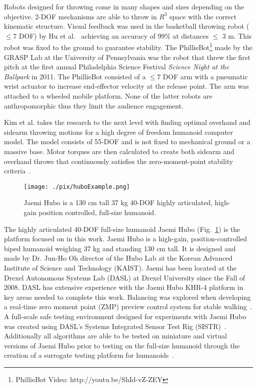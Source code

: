 Robots designed for throwing come in many shapes and sizes depending on the objective.  
2-DOF mechanisms are able to throw in $R^3$ space with the correct kinematic structure.  
Visual feedback was used in the basketball throwing robot ($\leq 7$ DOF) by Hu et al.~\cite{5649335} achieving an accuracy of 99\% at distances $\leq$ 3 m.  
This robot was fixed to the ground to guarantee stability.
The PhillieBot\footnote{PhillieBot Video: http://youtu.be/ShId-vZ-ZEY} made by the GRASP Lab at the University of Pennsylvania was the robot that threw the first pitch at the first annual Philadelphia Science Festival \textit{Science Night at the Ballpark} in 2011.  
The PhillieBot consisted of a $\leq 7$ DOF arm with a pneumatic wrist actuator to increase end-effector velocity at the release point.  
The arm was attached to a wheeled mobile platform.
None of the latter robots are anthropomorphic thus they limit the audience engagement.

Kim et al. \cite{5686315,JooH2011438} takes the research to the next level with finding optimal overhand and sidearm throwing motions for a high degree of freedom humanoid computer model.  
The model consists of 55-DOF and is not fixed to mechanical ground or a massive base.  
Motor torques are then calculated to create both sidearm and overhand throws that continuously satisfies the zero-moment-point stability criteria~\cite{4309277}.  

\begin{figure}[t]
  \centering
\texttt{[image: ./pix/huboExample.png]}
  \caption{Jaemi Hubo is a 130 cm tall 37 kg 40-DOF highly articulated, high-gain position controlled, full-size humanoid.}
  \label{fig:huboFig}
\end{figure}


The highly articulated 40-DOF full-size humanoid Jaemi Hubo (Fig.~\ref{fig:huboFig}) is the platform focused on in this work.  Jaemi Hubo is a high-gain, position-controlled biped humanoid weighing 37 kg and standing 130 cm tall.  It is designed and made by Dr. Jun-Ho Oh director of the Hubo Lab at the Korean Advanced Institute of Science and Technology (KAIST).  Jaemi has been located at the Drexel Autonomous Systems Lab (DASL) at Drexel University since the Fall of 2008.  DASL has extensive experience with the Jaemi Hubo KHR-4 platform in key areas needed to complete this work.  Balancing was explored when developing a real-time zero moment point (ZMP) preview control system for stable walking~\cite{5686276}.  A full-scale safe testing environment designed for experiments with Jaemi Hubo was created using DASL's Systems Integrated Sensor Test Rig (SISTR)~\cite{5686325}.  Additionally all algorithms are able to be tested on miniature and virtual versions of Jaemi Hubo prior to testing on the full-size humanoid through the creation of a surrogate testing platform for humanoids~\cite{5379582}.



